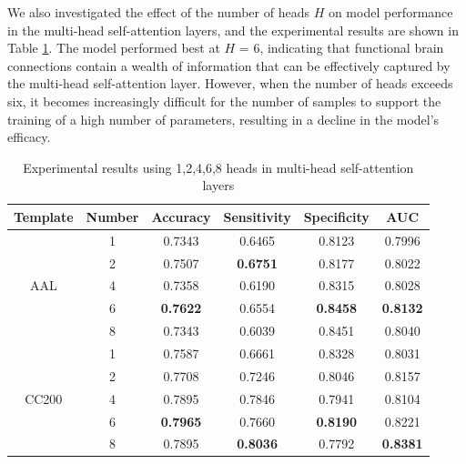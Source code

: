 \documentclass[journal,twoside,web]{ieeecolor}
\begin{document}
We also investigated the effect of the number of heads $H$ on model performance in the multi-head self-attention layers, and the experimental results are shown in Table \ref{Table3}. The model performed best at $H$ = 6, indicating that functional brain connections contain a wealth of information that can be effectively captured by the multi-head self-attention layer. However, when the number of heads exceeds six, it becomes increasingly difficult for the number of samples to support the training of a high number of parameters, resulting in a decline in the model's efficacy.
\begin{table}
	\centering
	\caption{Experimental results using 1,2,4,6,8 heads in multi-head self-attention layers}
	\label{Table3}
	\tabcolsep=1cm
	\begin{tabular*}{\textwidth}{cccccc}
		\toprule
		\multicolumn{1}{l}{\textbf{Template}} & \textbf{Number} & \textbf{Accuracy} & \textbf{Sensitivity} & \textbf{Specificity} & \textbf{AUC}     \\ 
		\midrule
		\multirow{5}{*}{AAL}                  & 1               & 0.7343            & 0.6465               & 0.8123               & 0.7996           \\
		& 2               & 0.7507            & \textbf{0.6751}      & 0.8177               & 0.8022           \\
		& 4               & 0.7358            & 0.6190               & 0.8315               & 0.8028           \\
		& 6               & \textbf{0.7622}   & 0.6554               & \textbf{0.8458}      & \textbf{0.8132}  \\
		& 8               & 0.7343            & 0.6039               & 0.8451               & 0.8040           \\ 
		\midrule
		\multirow{5}{*}{CC200}                & 1               & 0.7587            & 0.6661               & 0.8328               & 0.8031           \\
		& 2               & 0.7708            & 0.7246               & 0.8046               & 0.8157           \\
		& 4               & 0.7895            & 0.7846               & 0.7941               & 0.8104           \\
		& 6               & \textbf{0.7965}   & 0.7660               & \textbf{0.8190}      & 0.8221           \\
		& 8               & 0.7895            & \textbf{0.8036}      & 0.7792               & \textbf{0.8381}  \\
		\bottomrule
	\end{tabular*}
\end{table}
\end{document}
